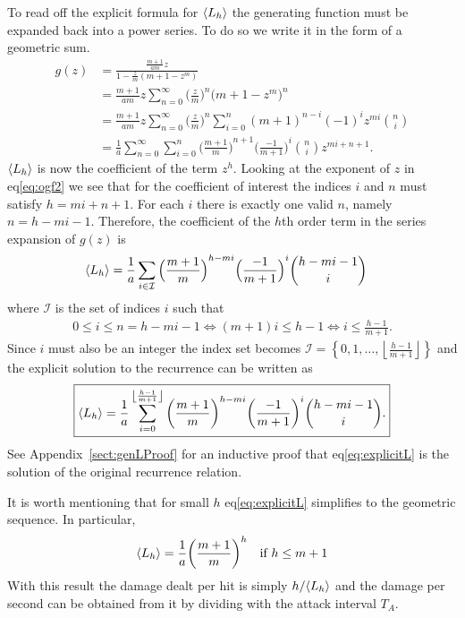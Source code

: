 To read off the explicit formula for $\langle L_h \rangle$ the generating function must be expanded back into a power series. To do so we write it in the form of a geometric sum.
\begin{align}
	g(z) &= \frac{\frac{m+1}{am}z}{1 - \frac{z}{m}(m+1-z^m)}\nonumber\\
	&= \frac{m+1}{am}z \sum_{n=0}^\infty {\Big(\frac{z}{m}\Big)}^n {\big(m+1-z^m\big)}^n\nonumber\\
	&= \frac{m+1}{am}z \sum_{n=0}^\infty {\Big(\frac{z}{m}\Big)}^n \sum_{i=0}^{n} {(m+1)}^{n-i}{(-1)}^i z^{mi} {n \choose i}\nonumber\\
	&= \frac{1}{a} \sum_{n=0}^\infty \sum_{i=0}^{n} {\Big(\frac{m+1}{m}\Big)}^{n+1} {\Big(\frac{-1}{m+1}\Big)}^i {n \choose i}z^{mi+n+1}\label{eq:ogf2}.
\end{align}
$\langle L_h \rangle$ is now the coefficient of the term $z^h$. Looking at the exponent of $z$ in eq\ref{eq:ogf2} we see that for the coefficient of interest the indices $i$ and $n$ must satisfy $h=mi+n+1$. For each $i$ there is exactly one valid $n$, namely $n = h-mi-1$.
Therefore, the coefficient of the $h$th order term in the series expansion of $g(z)$ is
\begin{align}
    \langle L_h \rangle &= \frac{1}{a}\sum_{i \in \mathcal{I}} {\Big(\frac{m+1}{m}\Big)}^{h-mi} {\Big(\frac{-1}{m+1}\Big)}^i {h-mi-1 \choose i} \nonumber
\end{align}
where $\mathcal{I}$ is the set of indices $i$ such that
\begin{align*}
    0 \leq i \leq n = h-mi-1
    \iff (m+1)i \leq h-1
    \iff i \leq \frac{h-1}{m+1}.
\end{align*}
Since $i$ must also be an integer the index set becomes $\mathcal{I} = \left\{0,1,\ldots,\left\lfloor{\frac{h-1}{m+1}}\right\rfloor\right\}$ and the explicit solution to the recurrence can be written as
\begin{align}
	\boxed{\langle L_h \rangle
		= \frac{1}{a}\sum_{i=0}^{\left\lfloor{\frac{h-1}{m+1}}\right\rfloor} {\left(\frac{m+1}{m}\right)}^{h-mi} {\left(\frac{-1}{m+1}\right)}^i {h-mi-1 \choose i}.
	}\label{eq:explicitL}
\end{align}
See Appendix~\ref{sect:genLProof} for an inductive proof that eq\ref{eq:explicitL} is the solution of the original recurrence relation.

It is worth mentioning that for small $h$ eq\ref{eq:explicitL} simplifies to the geometric sequence. In particular,
\begin{align}
	\langle L_h \rangle
		= \frac{1}{a}{\left(\frac{m+1}{m}\right)}^h \quad \mbox{if }h \leq m+1
	\label{eq:geomL}
\end{align}
With this result the damage dealt per hit is simply $h/\langle L_h \rangle$ and the damage per second can be obtained from it by dividing with the attack interval $T_A$.
